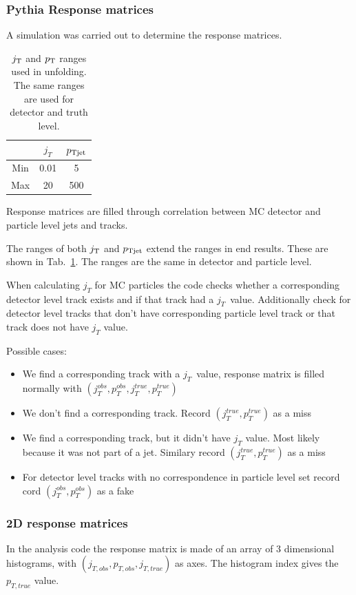 \subsubsection{Pythia Response matrices}
A  simulation was carried out to determine the response matrices. 

\begin{table}
\centering
\caption{$j_{\rm T}$ and $p_{\rm T}$ ranges used in unfolding. The same ranges are used for detector and truth level.}
\label{tab:unfranges}
\begin{tabular}{c | c | c}
 & $j_T$ & $p_{\rm Tjet}$ \\
 \hline
Min & 0.01 & 5 \\
Max & 20 & 500 \\
\hline
\end{tabular}
\end{table}

Response matrices are filled through correlation between MC detector and particle level jets and tracks.

The ranges of both $j_{\rm T}$ and $p_{\rm Tjet}$ extend the ranges in end results. These are shown in Tab.~\ref{tab:unfranges}. The ranges are the same in detector and particle level.

When calculating $j_T$ for MC particles the code checks whether a corresponding detector level track exists and if that track had a $j_T$ value. Additionally check for detector level tracks that don't have corresponding particle level track or that track does not have $j_T$ value.

Possible cases:
\begin{itemize}
\item We find a corresponding track with a $j_T$ value, response matrix is filled normally with $\left(j^{obs}_{T},p_T^{obs},j^{true}_{T},p_T^{true}\right)$
\item We don't find a corresponding track. Record $\left(j^{true}_{T},p_T^{true}\right)$ as a miss 
\item We find a corresponding track, but it didn't have $j_T$ value. Most likely because it was not part of a jet. Similary record $\left(j^{true}_{T},p_T^{true}\right)$ as a miss
\item For detector level tracks with no correspondence in particle level set record cord $\left(j^{obs}_{T},p_T^{obs}\right)$ as a fake
\end{itemize}

\subsubsection{2D response matrices}
In the analysis code the response matrix is made of an array of 3 dimensional histograms, with $\left(j_{T,obs},p_{T,obs},j_{T,true}\right)$ as axes. The histogram index gives the $p_{T,true}$ value.

